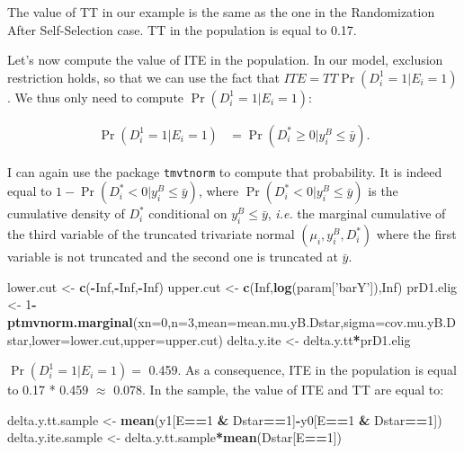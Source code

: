 \documentclass[]{book}
\newenvironment{Shaded}{\begin{snugshade}}{\end{snugshade}}
\newcommand{\KeywordTok}[1]{\textcolor[rgb]{0.13,0.29,0.53}{\textbf{#1}}}
\newcommand{\DataTypeTok}[1]{\textcolor[rgb]{0.13,0.29,0.53}{#1}}
\newcommand{\DecValTok}[1]{\textcolor[rgb]{0.00,0.00,0.81}{#1}}
\newcommand{\StringTok}[1]{\textcolor[rgb]{0.31,0.60,0.02}{#1}}
\newcommand{\OtherTok}[1]{\textcolor[rgb]{0.56,0.35,0.01}{#1}}
\newcommand{\OperatorTok}[1]{\textcolor[rgb]{0.81,0.36,0.00}{\textbf{#1}}}
\newcommand{\NormalTok}[1]{#1}
\theoremstyle{definition}
\theoremstyle{definition}
\theoremstyle{definition}
\theoremstyle{remark}
\begin{document}
The value of TT in our example is the same as the one in the
Randomization After Self-Selection case. TT in the population is equal
to 0.17.

Let's now compute the value of ITE in the population. In our model,
exclusion restriction holds, so that we can use the fact that
\(ITE=TT\Pr(D^1_i=1|E_i=1)\). We thus only need to compute
\(\Pr(D^1_i=1|E_i=1)\):

\begin{align*}
  \Pr(D^1_i=1|E_i=1) & = \Pr(D_i^*\geq0|y_i^B\leq\bar{y}).
\end{align*}

I can again use the package \texttt{tmvtnorm} to compute that
probability. It is indeed equal to \(1-\Pr(D_i^*<0|y_i^B\leq\bar{y})\),
where \(\Pr(D_i^*<0|y_i^B\leq\bar{y})\) is the cumulative density of
\(D_i^*\) conditional on \(y_i^B\leq\bar{y}\), \textit{i.e.} the
marginal cumulative of the third variable of the truncated trivariate
normal \((\mu_i,y_i^B,D_i^*)\) where the first variable is not truncated
and the second one is truncated at \(\bar{y}\).

\begin{Shaded}
\begin{Highlighting}[]
\NormalTok{lower.cut <-}\StringTok{ }\KeywordTok{c}\NormalTok{(}\OperatorTok{-}\OtherTok{Inf}\NormalTok{,}\OperatorTok{-}\OtherTok{Inf}\NormalTok{,}\OperatorTok{-}\OtherTok{Inf}\NormalTok{)}
\NormalTok{upper.cut <-}\StringTok{ }\KeywordTok{c}\NormalTok{(}\OtherTok{Inf}\NormalTok{,}\KeywordTok{log}\NormalTok{(param[}\StringTok{'barY'}\NormalTok{]),}\OtherTok{Inf}\NormalTok{)}
\NormalTok{prD1.elig <-}\StringTok{ }\DecValTok{1}\OperatorTok{-}\KeywordTok{ptmvnorm.marginal}\NormalTok{(}\DataTypeTok{xn=}\DecValTok{0}\NormalTok{,}\DataTypeTok{n=}\DecValTok{3}\NormalTok{,}\DataTypeTok{mean=}\NormalTok{mean.mu.yB.Dstar,}\DataTypeTok{sigma=}\NormalTok{cov.mu.yB.Dstar,}\DataTypeTok{lower=}\NormalTok{lower.cut,}\DataTypeTok{upper=}\NormalTok{upper.cut)}
\NormalTok{delta.y.ite <-}\StringTok{ }\NormalTok{delta.y.tt}\OperatorTok{*}\NormalTok{prD1.elig}
\end{Highlighting}
\end{Shaded}

\(\Pr(D^1_i=1|E_i=1)=\) 0.459. As a consequence, ITE in the population
is equal to 0.17 * 0.459 \(\approx\) 0.078. In the sample, the value of
ITE and TT are equal to:

\begin{Shaded}
\begin{Highlighting}[]
\NormalTok{delta.y.tt.sample <-}\StringTok{ }\KeywordTok{mean}\NormalTok{(y1[E}\OperatorTok{==}\DecValTok{1} \OperatorTok{&}\StringTok{ }\NormalTok{Dstar}\OperatorTok{==}\DecValTok{1}\NormalTok{]}\OperatorTok{-}\NormalTok{y0[E}\OperatorTok{==}\DecValTok{1} \OperatorTok{&}\StringTok{ }\NormalTok{Dstar}\OperatorTok{==}\DecValTok{1}\NormalTok{])}
\NormalTok{delta.y.ite.sample <-}\StringTok{ }\NormalTok{delta.y.tt.sample}\OperatorTok{*}\KeywordTok{mean}\NormalTok{(Dstar[E}\OperatorTok{==}\DecValTok{1}\NormalTok{])}
\end{Highlighting}
\end{Shaded}
\end{document}
